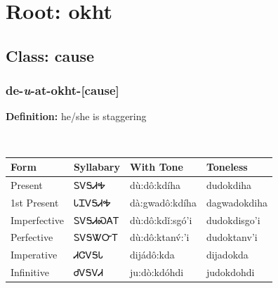 \needspace{4in}
\section*{Root: okht}
\nopagebreak
{}
\needspace{3in}
\subsection*{Class: cause}
\nopagebreak
\needspace{2in}
\subsubsection*{de{-}\textit{u}{-}at{-}\textbf{okht}{-}[cause]}
\nopagebreak
\textbf{Definition: } he/she is staggering
\\[0.5em]
\begin{tabularx}{\textwidth}{l X X X}%
\toprule%
\textbf{Form}&\textbf{Syllabary}&\textbf{With Tone}&\textbf{Toneless}\\%
\midrule%
Present&ᏚᏙᎦᏗᎭ&dù:dô:kdíha&dudokdiha\\%
1st Present&ᏓᏆᏙᎦᏗᎭ&dà:gwadô:kdíha&dagwadokdiha\\%
Imperfective&ᏚᏙᎦᏗᏍᎪᎢ&dù:dô:kdǐ:sgó’i&dudokdisgo’i\\%
Perfective&ᏚᏙᎦᏔᏅᎢ&dù:dô:ktanv́:’i&dudoktanv’i\\%
Imperative&ᏗᏣᏙᎦᏓ&dijádô:kda&dijadokda\\%
Infinitive&ᏧᏙᎦᏙᏗ&ju:dò:kdóhdi&judokdohdi\\%
\bottomrule%
\end{tabularx}
\\[1em]